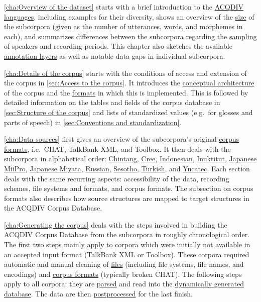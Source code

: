 \documentclass[a4paper, 11pt]{book}
\begin{document}
\autoref{cha:Overview of the dataset} starts with a brief introduction to the \hyperref[sec:The language sample]{ACQDIV languages}, including examples for their diversity, shows an overview of the \hyperref[sec:Amount of data]{size} of the subcorpora (given as the number of utterances, words, and morphemes in each), and summarizes differences between the subcorpora regarding the \hyperref[sec:Sampling for speakers and periods]{sampling} of speakers and recording periods. This chapter also sketches the available \hyperref[sec:Annotation layers and data gaps]{annotation layers} as well as notable data gaps in individual subcorpora. 

\autoref{cha:Details of the corpus} starts with the conditions of access and extension of the corpus in \autoref{sec:Access to the corpus}. It introduces the \hyperref[sec:Architecture]{conceptual architecture} of the corpus and the \hyperref[sec:Format]{formats} in which this is implemented. This is followed by detailed information on the tables and fields of the corpus database in \autoref{sec:Structure of the corpus} and lists of standardized values (e.g.\ for glosses and parts of speech) in \autoref{sec:Conventions and standardization}. 

\autoref{cha:Data sources} first gives an overview of the subcorpora's original \hyperref[sec:Corpus formats]{corpus formats}, i.e.\ CHAT, TalkBank XML, and Toolbox. It then deals with the subcorpora in alphabetical order: \hyperref[sec:Chintang]{Chintang}, \hyperref[sec:Cree]{Cree}, \hyperref[sec:Indonesian]{Indonesian}, \hyperref[sec:Inuktitut]{Inuktitut}, \hyperref[sec:Japanese MiiPro]{Japanese MiiPro}, \hyperref[sec:Japanese Miyata]{Japanese Miyata}, \hyperref[sec:Russian]{Russian}, \hyperref[sec:Sesotho]{Sesotho}, \hyperref[sec:Turkish]{Turkish}, and \hyperref[sec:Yucatec]{Yucatec}. Each section deals with the same recurring aspects: accessibility of the data, recording schemes, file systems and formats, and corpus formats. The subsection on corpus formats also describes how source structures are mapped to target structures in the ACQDIV Corpus Database. 

\autoref{cha:Generating the corpus} deals with the steps involved in building the ACQDIV Corpus Database from the subcorpora in roughly chronological order. The first two steps mainly apply to corpora which were initially not available in an accepted input format (TalkBank XML or Toolbox). These corpora required automatic and manual cleaning of \hyperref[sec:Cleaning of file formats]{files} (including file systems, file names, and encodings) and \hyperref[sec:Cleaning of corpus formats]{corpus formats} (typically broken CHAT). The following steps apply to all corpora: they are \hyperref[sec:Parsing the corpus data]{parsed} and read into the \hyperref[sec:Building the database and postprocessing]{dynamically generated database}. The data are then \hyperref[sec:Building the database and postprocessing]{postprocessed} for the last finish. 
\end{document}
